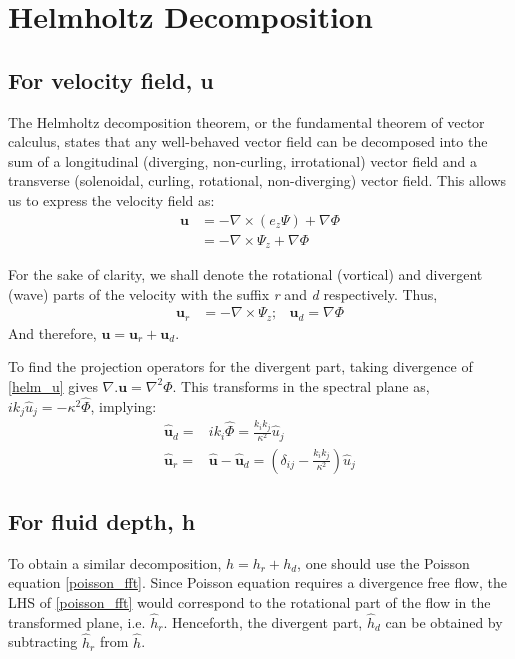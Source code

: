 \documentclass[a4paper,12pt]{paper}
\begin{document}
\section{Helmholtz Decomposition}
\subsection{For velocity field, u}
The Helmholtz decomposition theorem, or the fundamental theorem of vector 
calculus, 
states that any well-behaved vector field can be decomposed into
the sum of a longitudinal (diverging, non-curling, irrotational) vector field 
and 
a transverse (solenoidal, curling, rotational, non-diverging) vector field. 
This allows us to express the velocity field as:
\begin{align}
\label{helm_u}
\mathbf u & = -\nabla \times (e_z \Psi) + \nabla \Phi\\
	& =  -\nabla \times \Psi_z + \nabla \Phi
\end{align}

For the sake of clarity,
we shall denote the rotational (vortical) and divergent (wave) parts of the 
velocity with the suffix \emph{r} and \emph{d} respectively. Thus,
\begin{align}
\mathbf u_r & = -\nabla \times \Psi_z ; &\mathbf u_d =   \nabla \Phi
\end{align}
And therefore, $\mathbf u  = \mathbf u_r + \mathbf u_d$.

To find the projection operators for the divergent part, taking divergence of 
\eqref{helm_u} gives $\nabla .\mathbf{u} = \nabla^2 \Phi
$.
This transforms in the spectral plane as, $ik_j \hat{u}_j = -\kappa^2 
\hat{\Phi}$, implying:
\begin{align}
\mathbf{\hat{u}}_d =& ik_i \hat{\Phi} = \frac{k_i k_j}{\kappa^2} \hat{u}_j\\
\mathbf{\hat{u}}_r =& \mathbf{\hat{u}} - \mathbf{\hat{u}}_d = \left( \delta_{ij} 
- \frac{k_i k_j}{\kappa^2} \right) \hat{u}_j
\end{align}

\subsection{For fluid depth, h}
To obtain a similar decomposition, $h = h_r + h_d$, one should use the Poisson 
equation \eqref{poisson_fft}.
Since Poisson equation requires a divergence free flow, the LHS of 
\eqref{poisson_fft} would correspond to the rotational part of the flow in the 
transformed plane, i.e. $\hat{h}_r$. Henceforth, the divergent part, $\hat{h}_d$ 
can be obtained by subtracting $\hat{h}_r$ from $\hat{h}$.
\end{document}
